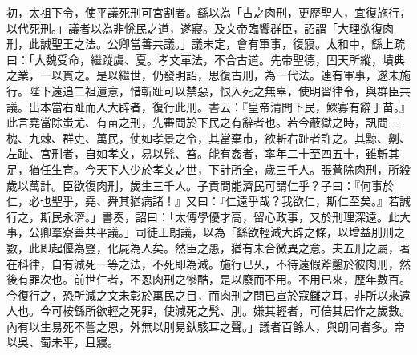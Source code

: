 \begin{pinyinscope}
 
初，太祖下令，使平議死刑可宮割者。繇以為「古之肉刑，更歷聖人，宜復施行，以代死刑。」議者以為非恱民之道，遂寢。及文帝臨饗群臣，詔謂「大理欲復肉刑，此誠聖王之法。公卿當善共議。」議未定，會有軍事，復寢。太和中，繇上疏曰：「大魏受命，繼蹤虞、夏。孝文革法，不合古道。先帝聖德，固天所縱，墳典之業，一以貫之。是以繼世，仍發明詔，思復古刑，為一代法。連有軍事，遂未施行。陛下遠追二祖遺意，惜斬趾可以禁惡，恨入死之無辜，使明習律令，與群臣共議。出本當右趾而入大辟者，復行此刑。書云：『皇帝清問下民，鰥寡有辭于苗。』此言堯當除蚩尤、有苗之刑，先審問於下民之有辭者也。若今蔽獄之時，訊問三槐、九棘、群吏、萬民，使如孝景之令，其當棄巿，欲斬右趾者許之。其黥、劓、左趾、宮刑者，自如孝文，易以髠、笞。能有姦者，率年二十至四五十，雖斬其足，猶任生育。今天下人少於孝文之世，下計所全，歲三千人。張蒼除肉刑，所殺歲以萬計。臣欲復肉刑，歲生三千人。子貢問能濟民可謂仁乎？子曰：『何事於仁，必也聖乎，堯、舜其猶病諸！』又曰：『仁遠乎哉？我欲仁，斯仁至矣。』若誠行之，斯民永濟。」書奏，詔曰：「太傅學優才高，留心政事，又於刑理深遠。此大事，公卿羣寮善共平議。」司徒王朗議，以為「繇欲輕減大辟之條，以增益刖刑之數，此即起偃為豎，化屍為人矣。然臣之愚，猶有未合微異之意。夫五刑之屬，著在科律，自有減死一等之法，不死即為減。施行已乆，不待遠假斧鑿於彼肉刑，然後有罪次也。前世仁者，不忍肉刑之慘酷，是以廢而不用。不用已來，歷年數百。今復行之，恐所減之文未彰於萬民之目，而肉刑之問已宣於寇讎之耳，非所以來遠人也。今可桉繇所欲輕之死罪，使減死之髠、刖。嫌其輕者，可倍其居作之歲數。內有以生易死不訾之恩，外無以刖易釱駭耳之聲。」議者百餘人，與朗同者多。帝以吳、蜀未平，且寢。

\end{pinyinscope}
